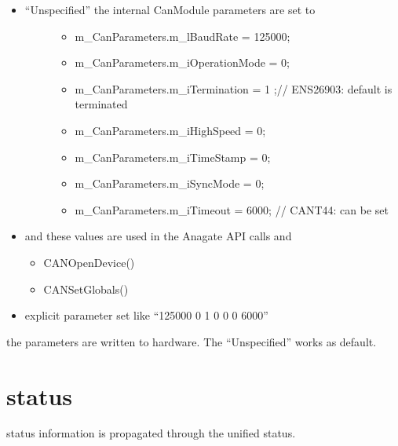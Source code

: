 \documentclass[a4paper,10pt,english]{sphinxmanual}
\begin{document}
\begin{itemize}
\item {} \begin{description}
\item[{“Unspecified” the internal CanModule parameters are set to}] \leavevmode\begin{itemize}
\item {} 
\sphinxAtStartPar
m\_CanParameters.m\_lBaudRate = 125000;

\item {} 
\sphinxAtStartPar
m\_CanParameters.m\_iOperationMode = 0;

\item {} 
\sphinxAtStartPar
m\_CanParameters.m\_iTermination = 1 ;// ENS\sphinxhyphen{}26903: default is terminated

\item {} 
\sphinxAtStartPar
m\_CanParameters.m\_iHighSpeed = 0;

\item {} 
\sphinxAtStartPar
m\_CanParameters.m\_iTimeStamp = 0;

\item {} 
\sphinxAtStartPar
m\_CanParameters.m\_iSyncMode = 0;

\item {} 
\sphinxAtStartPar
m\_CanParameters.m\_iTimeout = 6000; // CANT\sphinxhyphen{}44: can be set

\end{itemize}

\end{description}

\item {} 
\sphinxAtStartPar
and these values are used in the Anagate API calls and
\begin{itemize}
\item {} 
\sphinxAtStartPar
CANOpenDevice()

\item {} 
\sphinxAtStartPar
CANSetGlobals()

\end{itemize}

\item {} 
\sphinxAtStartPar
explicit parameter set like “125000 0 1 0 0 0 6000”

\end{itemize}

\sphinxAtStartPar
the parameters are written to hardware. The “Unspecified” works as default.


\section{status}
\label{\detokenize{vendors/anagate:status}}
\sphinxAtStartPar
status information is propagated through the unified status.
\end{document}
